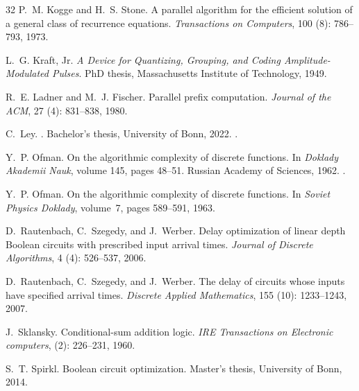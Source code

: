 \begin{thebibliography}{32}
P.~M. Kogge and H.~S. Stone.
\newblock A parallel algorithm for the efficient solution of a general class of
  recurrence equations.
\newblock \emph{Transactions on Computers}, 100 (8):
  786--793, 1973.

L.~G. {Kraft, Jr.}
\newblock \emph{A Device for Quantizing, Grouping, and Coding
  Amplitude-Modulated Pulses}.
\newblock PhD thesis, Massachusetts Institute of Technology, 1949.

R.~E. Ladner and M.~J. Fischer.
\newblock Parallel prefix computation.
\newblock \emph{Journal of the ACM}, 27 (4): 831--838, 1980.

C.~Ley.
.
\newblock Bachelor's thesis, University of Bonn, 2022.
.

Y.~P. Ofman.
\newblock On the algorithmic complexity of discrete functions.
\newblock In \emph{Doklady Akademii Nauk}, volume 145, pages 48--51. Russian
  Academy of Sciences, 1962.
 \cite{Ofman63Eng}.

Y.~P. Ofman.
\newblock On the algorithmic complexity of discrete functions.
\newblock In \emph{Soviet Physics Doklady}, volume~7, pages 589--591, 1963.

D.~Rautenbach, C.~Szegedy, and J.~Werber.
\newblock Delay optimization of linear depth {Boolean} circuits with prescribed
  input arrival times.
\newblock \emph{Journal of Discrete Algorithms}, 4 (4):
  526--537, 2006.

D.~Rautenbach, C.~Szegedy, and J.~Werber.
\newblock The delay of circuits whose inputs have specified arrival times.
\newblock \emph{Discrete Applied Mathematics}, 155 (10):
  1233--1243, 2007.

J.~Sklansky.
\newblock Conditional-sum addition logic.
\newblock \emph{IRE Transactions on Electronic computers}, 
  (2): 226--231, 1960.

S.~T. Spirkl.
\newblock Boolean circuit optimization.
\newblock Master's thesis, University of Bonn, 2014.


\end{thebibliography}
